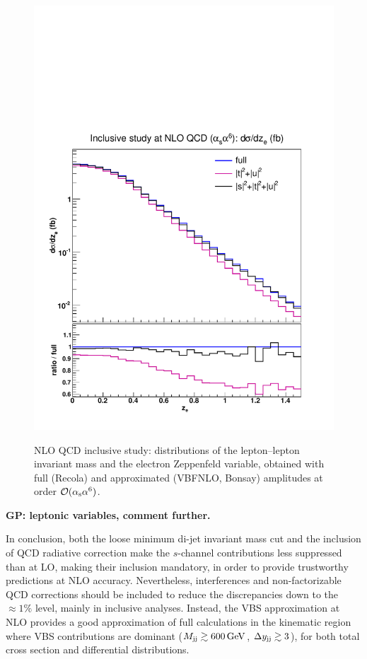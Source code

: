 \begin{figure}[hbt]
{\includegraphics[scale=0.35]{figures/scanfigures/zel_nlo.pdf}}
\caption{NLO QCD inclusive study: distributions of the lepton--lepton invariant mass and the electron Zeppenfeld variable, obtained with full ({\sc Recola}) and approximated ({\sc VBFNLO, Bonsay}) amplitudes at order $\mathcal{O}(\alpha_\text{s}\alpha^6)$.} \label{fig:mjjdyjj_1d_3}
\end{figure}
{\bf GP: leptonic variables, comment further.}


In conclusion, both the loose minimum di-jet invariant mass cut and the inclusion of QCD radiative correction make the $s$-channel contributions less suppressed than at LO, making their inclusion mandatory, in order to provide trustworthy predictions at NLO accuracy.
Nevertheless, interferences and non-factorizable QCD corrections should be included to reduce the discrepancies down to the $\approx 1\%$  level, mainly in inclusive analyses.
Instead, the VBS approximation at NLO provides a good approximation of full calculations in the kinematic region where VBS contributions are dominant ($M_{\text{j}\text{j}} \gtrsim 600 \,\text{GeV}$, $\Delta y_{\text{j}\text{j}} \gtrsim 3$), for both total cross section and differential distributions.
